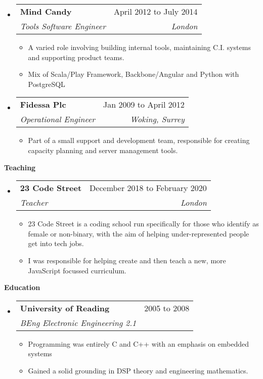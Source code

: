 \documentclass[letterpaper,12pt]{article}[leftmargin=*]
\makeatletter
\def \entryspacing {-0pt}
\renewcommand{\section}[2]{\vspace{5pt}
  \colorbox{secondary}{\color{white}\raggedbottom\normalsize{#1}{\hspace{7pt}\textbf{#2}}}
}
\newenvironment{resumeEntry}[0]{
  \begin{itemize}[leftmargin=2.5mm]
  }{
  \end{itemize}\vspace{\entryspacing}
}
\newenvironment{resumeItemList}[0]{
  \begin{itemize}[leftmargin=4.5mm]
  }{
  \end{itemize}
}
\newcommand{\resumeItem}[1]{
  \item\small{
    {#1 \vspace{-2pt}}
  }
}
\newcommand{\resumeEntryTSDL}[4]{
  \vspace{-1pt}\item[]
    \begin{tabularx}{0.97\textwidth}{X@{\hspace{60pt}}r}
      \textbf{\color{primary}#1} & {\firabook\color{accent}\small#2} \\
      \textit{\color{accent}\small#3} & \textit{\color{accent}\small#4} \\
    \end{tabularx}\vspace{-6pt}
}
\makeatother
\begin{document}
  \begin{resumeEntry}
    \resumeEntryTSDL{Mind Candy}{April 2012 to July 2014}{Tools Software Engineer}{London}
    \begin{resumeItemList}
      \resumeItem{A varied role involving building internal tools, maintaining C.I. systems and supporting product teams.}
      \resumeItem{Mix of Scala/Play Framework, Backbone/Angular and Python with PostgreSQL}
    \end{resumeItemList}
  \end{resumeEntry}

  \begin{resumeEntry}
    \resumeEntryTSDL{Fidessa Plc}{Jan 2009 to April 2012}{Operational Engineer}{Woking, Surrey}
    \begin{resumeItemList}
      \resumeItem{Part of a small support and development team, responsible for creating capacity planning and server management tools.}
    \end{resumeItemList}
  \end{resumeEntry}

\section{\faGraduationCap}{Teaching}

  \begin{resumeEntry}
    \resumeEntryTSDL{23 Code Street}{December 2018 to February 2020}{Teacher}{London}
    \begin{resumeItemList}
      \resumeItem{23 Code Street is a coding school run specifically for those who identify as female or non-binary, with the aim of helping under-represented people get into tech jobs.}
      \resumeItem{I was responsible for helping create and then teach a new, more JavaScript focussed curriculum.}
    \end{resumeItemList}
  \end{resumeEntry}

\section{\faUniversity}{Education}

  \begin{resumeEntry}
    \resumeEntryTSDL{University of Reading}{2005 to 2008}
      {BEng Electronic Engineering 2.1}{}
    \begin{resumeItemList}
        \resumeItem{Programming was entirely C and C++ with an emphasis on embedded systems}
        \resumeItem{Gained a solid grounding in DSP theory and engineering mathematics.}
    \end{resumeItemList}
  \end{resumeEntry}
\end{document}
